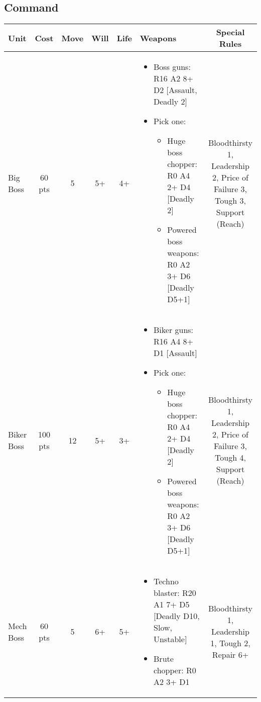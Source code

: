 \documentclass[landscape]{extarticle}
\begin{document}
\begin{small}

\section*{Command}

\begin{tabular}{UccccWS}

\textbf{Unit} & \textbf{Cost} & \textbf{Move} & \textbf{Will} & \textbf{Life} & \textbf{Weapons} & \textbf{Special Rules} \\


\hline


Big Boss
&
60 pts
&
5
&
5+
&
4+
&
\begin{itemize}
    \item Boss guns: R16 A2 8+ D2 [Assault, Deadly 2]
    \item Pick one:
    \begin{itemize}
        \item Huge boss chopper: R0 A4 2+ D4 [Deadly 2]
        \item Powered boss weapons: R0 A2 3+ D6 [Deadly D5+1]
    \end{itemize}
\end{itemize}
&
Bloodthirsty 1, Leadership 2, Price of Failure 3, Tough 3, Support (Reach)


\\


Biker Boss 
&
100 pts
&
12
&
5+
&
3+
&
\begin{itemize}
    \item Biker guns: R16 A4 8+ D1 [Assault]
    \item Pick one:
    \begin{itemize}
        \item Huge boss chopper: R0 A4 2+ D4 [Deadly 2]
        \item Powered boss weapons: R0 A2 3+ D6 [Deadly D5+1]
    \end{itemize}
\end{itemize}
&
Bloodthirsty 1, Leadership 2, Price of Failure 3, Tough 4, Support (Reach)


\\


Mech Boss 
&
60 pts
&
5
&
6+
&
5+
&
\begin{itemize}
    \item Techno blaster: R20 A1 7+ D5 [Deadly D10, Slow, Unstable]
    \item Brute chopper: R0 A2 3+ D1
\end{itemize}
&
Bloodthirsty 1, Leadership 1, Tough 2, Repair 6+



\end{tabular}
\end{small}
\end{document}
